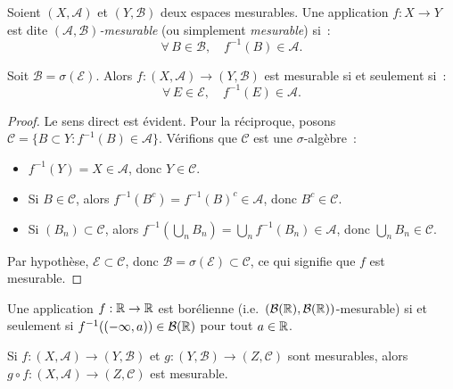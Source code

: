\begin{definition}
Soient $(X, \mathcal{A})$ et $(Y, \mathcal{B})$ deux espaces mesurables. Une
application $f : X \to Y$ est dite \emph{$(\mathcal{A}, \mathcal{B})$-mesurable}
(ou simplement \emph{mesurable}) si~:
\[
\forall\, B \in \mathcal{B}, \quad f^{-1}(B) \in \mathcal{A}.
\]
\end{definition}

\begin{proposition}
\label{prop:critere_mesurabilite}
Soit $\mathcal{B} = \sigma(\mathcal{E})$. Alors $f : (X, \mathcal{A}) \to
(Y, \mathcal{B})$ est mesurable si et seulement si~:
\[
\forall\, E \in \mathcal{E}, \quad f^{-1}(E) \in \mathcal{A}.
\]
\end{proposition}

\begin{proof}
Le sens direct est \'evident. Pour la r\'eciproque, posons
$\mathcal{C} = \{B \subset Y : f^{-1}(B) \in \mathcal{A}\}$.
V\'erifions que $\mathcal{C}$ est une $\sigma$-alg\`ebre~:
\begin{itemize}
    \item $f^{-1}(Y) = X \in \mathcal{A}$, donc $Y \in \mathcal{C}$.
    \item Si $B \in \mathcal{C}$, alors $f^{-1}(B^c) = f^{-1}(B)^c \in \mathcal{A}$,
    donc $B^c \in \mathcal{C}$.
    \item Si $(B_n) \subset \mathcal{C}$, alors
    $f^{-1}(\bigcup_n B_n) = \bigcup_n f^{-1}(B_n) \in \mathcal{A}$, donc
    $\bigcup_n B_n \in \mathcal{C}$.
\end{itemize}
Par hypoth\`ese, $\mathcal{E} \subset \mathcal{C}$, donc
$\mathcal{B} = \sigma(\mathcal{E}) \subset \mathcal{C}$, ce qui signifie que $f$
est mesurable.
\end{proof}

\begin{corollaire}
Une application $f : \mathbb{R} \to \mathbb{R}$ est bor\'elienne (i.e.\
$(\mathcal{B}(\mathbb{R}), \mathcal{B}(\mathbb{R}))$-mesurable) si et seulement si
$f^{-1}((-\infty, a)) \in \mathcal{B}(\mathbb{R})$ pour tout $a \in \mathbb{R}$.
\end{corollaire}

\begin{proposition}[Composition]
Si $f : (X, \mathcal{A}) \to (Y, \mathcal{B})$ et
$g : (Y, \mathcal{B}) \to (Z, \mathcal{C})$ sont mesurables, alors
$g \circ f : (X, \mathcal{A}) \to (Z, \mathcal{C})$ est mesurable.
\end{proposition}

